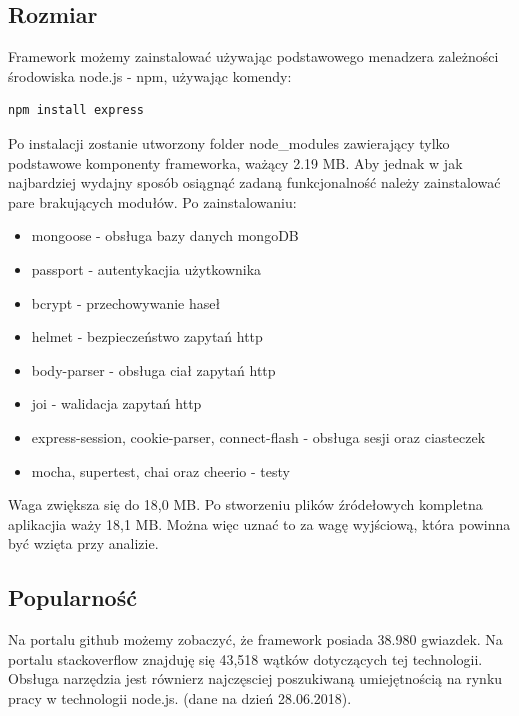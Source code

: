 \documentclass[12pt]{report}
\begin{document}
    \subsection{Rozmiar}
      Framework możemy zainstalować używając podstawowego menadzera zależności środowiska node.js - npm, używając komendy:
      \begin{lstlisting}[language=bash,numbers=none]
        npm install express
      \end{lstlisting}
      Po instalacji zostanie utworzony folder node\_modules zawierający tylko podstawowe komponenty frameworka, ważący 2.19 MB.
      Aby jednak w jak najbardziej wydajny sposób osiągnąć zadaną funkcjonalność należy zainstalować pare brakujących modułów.
      Po zainstalowaniu:
      \begin{itemize}
        \item mongoose - obsługa bazy danych mongoDB
        \item passport - autentykacjia użytkownika
        \item bcrypt - przechowywanie haseł
        \item helmet - bezpieczeństwo zapytań http
        \item body-parser - obsługa ciał zapytań http
        \item joi - walidacja zapytań http
        \item express-session, cookie-parser, connect-flash - obsługa sesji oraz ciasteczek
        \item mocha, supertest, chai oraz cheerio - testy 
      \end{itemize} 
      Waga zwiększa się do 18,0 MB.
      Po stworzeniu plików źródełowych kompletna aplikacjia waży 18,1 MB.
      Można więc uznać to za wagę wyjściową, która powinna być wzięta przy analizie.

    \subsection{Popularność}
      Na portalu github możemy zobaczyć, że framework posiada 38.980 gwiazdek.
      Na portalu stackoverflow znajduję się 43,518 wątków dotyczących tej technologii.
      Obsługa narzędzia jest równierz najczęsciej poszukiwaną umiejętnością na rynku pracy w technologii node.js.
      (dane na dzień 28.06.2018).
\end{document}
